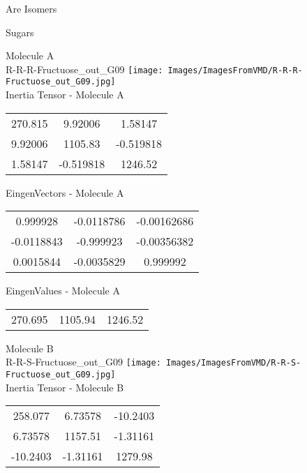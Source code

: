 \begin{center}
\vtab
\vtab
\textcolor{NavyBlue}{\Large Are Isomers}
\end{center}
\newpage

\vtab[-2cm]
\begin{center}
{\large Sugars}
\end{center}
\begin{multicols}{2}
\begin{center}
Molecule A \\ 
R-R-R-Fructuose\_out\_G09
\texttt{[image: Images/ImagesFromVMD/R-R-R-Fructuose\_out\_G09.jpg]}
\\
Inertia Tensor - Molecule A \\
\vtab
\begin{tabular}{|c c c|}
270.815	 & 	9.92006	 & 	1.58147	 \\
9.92006	 & 	1105.83	 & 	-0.519818	 \\
1.58147	 & 	-0.519818	 & 	1246.52
\end{tabular}

\vtab
 EingenVectors - Molecule A     \\
\vtab
\begin{tabular}{|c c c|}
0.999928	 & 	-0.0118786	 & 	-0.00162686	 \\
-0.0118843	 & 	-0.999923	 & 	-0.00356382	 \\
0.0015844	 & 	-0.0035829	 & 	0.999992
\end{tabular}

\vtab
 EingenValues - Molecule A     \\
\vtab
\begin{tabular}{|c c c|}
270.695	 & 	1105.94	 & 	1246.52
\end{tabular}
\columnbreak

Molecule B \\ 
R-R-S-Fructuose\_out\_G09
\texttt{[image: Images/ImagesFromVMD/R-R-S-Fructuose\_out\_G09.jpg]}
\\
Inertia Tensor - Molecule B \\
\vtab
\begin{tabular}{|c c c|}
258.077	 & 	6.73578	 & 	-10.2403	 \\
6.73578	 & 	1157.51	 & 	-1.31161	 \\
-10.2403	 & 	-1.31161	 & 	1279.98
\end{tabular}


\end{center}
\end{multicols}
